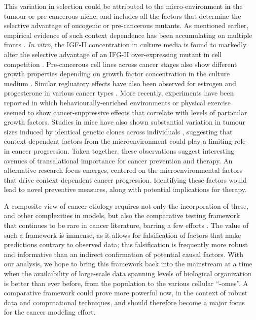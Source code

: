 \documentclass[9pt,twocolumn,twoside]{pnas-new}
\begin{document}
This variation in selection could be attributed to the micro-environment in the tumour or pre-cancerous niche, and includes all the factors that determine the selective advantage of oncogenic or pre-cancerous mutants. As mentioned earlier, empirical evidence of such context dependence has been accumulating on multiple fronts \cite{Hansen2000,Pietras2010,Hanahan2012,Cabarcas2011a}. \textit{In vitro}, the IGF-II concentration in culture media is found to markedly alter the selective advantage of an IFG-II over-expressing mutant in cell competition \cite{Archetti2015}. Pre-cancerous cell lines across cancer stages also show different growth properties depending on growth factor concentration in the culture medium \cite{Chan2014}. Similar regluatory effects have also been observed for estrogen and progesterone in various cancer types \cite{Haslam2001,Woodward2000,DICKSON1987,Garcia1992}. More recently, experiments have been reported in which behaviourally-enriched environments or physical exercise seemed to show cancer-suppressive effects \cite{Cao2010,Rundqvist2013} that correlate with levels of particular growth factors. Studies in mice have also shown substantial variation in tumour sizes induced by identical genetic clones across individuals \cite{Rogers2017}, suggesting that context-dependent factors from the microenvironment could play a limiting role in cancer progression. Taken together, these observations suggest interesting avenues of transalational importance for cancer prevention and therapy. An alternative research focus emerges, centered on the microenvironmental factors that drive context-dependent cancer progression. Identifying these factors would lead to novel preventive measures, along with potential implications for therapy.

A composite view of cancer etiology requires not only the incorporation of these, and other complexities in models, but also the comparative testing framework that continues to be rare in cancer literature, barring a few efforts \cite{Frank2007}. The value of such a framework is immense, as it allows for falsification of factors that make predictions contrary to observed data; this falsification is frequently more robust and informative than an indirect confirmation of potential causal factors. With our analysis, we hope to bring this framework back into the mainstream at a time when the availaibility of large-scale data spanning levels of biological organization is better than ever before, from the population to the various cellular ``-omes''. A comparative framework could prove more powerful now, in the context of robust data and computational techniques, and should therefore become a major focus for the cancer modeling effort.


\showacknow{} %




\end{document}
